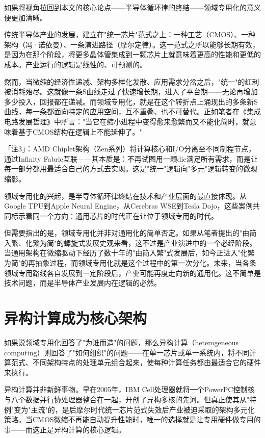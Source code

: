 \documentclass[11pt,a4paper]{article}
\begin{document}
如果将视角拉回到本文的核心论点——半导体循环律的终结——领域专用化的意义便更加清晰。

传统半导体产业的发展，建立在"统一芯片"范式之上：一种工艺（CMOS）、一种架构（冯·诺依曼）、一条演进路径（摩尔定律）。这一范式之所以能够长期有效，是因为在那个阶段，将更多晶体管集成到一颗芯片上就意味着更高的性能和更低的成本。产业运行的逻辑是线性的、可预测的。

然而，当微缩的经济性递减、架构多样化发散、应用需求分岔之后，"统一"的红利被消耗殆尽。这就像一条S曲线走过了快速增长期，进入了平台期——无论再增加多少投入，回报都在递减。而领域专用化，就是在这个转折点上涌现出的多条新S曲线，每一条都面向特定的应用空间，互不重叠、也不可替代。正如笔者在《集成电路发展哲理》中所言："当它在缩小进程中变得愈来愈繁而又不能化简时，就意味着基于CMOS结构在逻辑上不能延伸了。"

「注3」：AMD Chiplet架构（Zen系列）将计算核心和I/O分离至不同制程节点，通过Infinity Fabric互联——其本质是：不再试图用一颗die满足所有需求，而是让每一部分都用最适合自己的方式去实现。这是"统一"逻辑向"多元"逻辑转变的微观缩影。

领域专用化的兴起，是半导体循环律终结在技术和产业层面的最直接体现。从Google TPU到Apple Neural Engine，从Cerebras WSE到Tesla Dojo，这些案例共同标示着同一个方向：通用芯片的时代正在让位于领域专用的时代。

但需要指出的是，领域专用化并非对通用化的简单否定。如果从笔者提出的"由简入繁、化繁为简"的螺旋式发展史观来看，这不过是产业演进中的一个必经阶段。当通用架构在微缩驱动下经历了数十年的"由简入繁"式发展后，如今正进入"化繁为简"的再抽象过程，而领域专用化就是这个过程中的第一次分化。未来，当各条领域专用路线各自发展到一定阶段后，产业可能再度走向新的通用化。这不简单是技术问题，而是半导体产业发展内在逻辑的必然。

\section{异构计算成为核心架构}

如果说领域专用化回答了"为谁而造"的问题，那么异构计算（heterogeneous computing）则回答了"如何组织"的问题——在单一芯片或单一系统内，将不同计算范式、不同架构特点的处理单元组合起来，使每种计算任务都由最适合它的硬件来执行。

异构计算并非新鲜事物。早在2005年，IBM Cell处理器就将一个PowerPC控制核与八个数据并行协处理器整合在一起，开创了异构多核的先河。但真正使其从"特例"变为"主流"的，是后摩尔时代统一芯片范式失效后产业被迫采取的架构多元化策略。当CMOS微缩不再能自动提升性能时，唯一的选择就是让专用硬件做专用的事——而这正是异构计算的核心逻辑。
\end{document}
